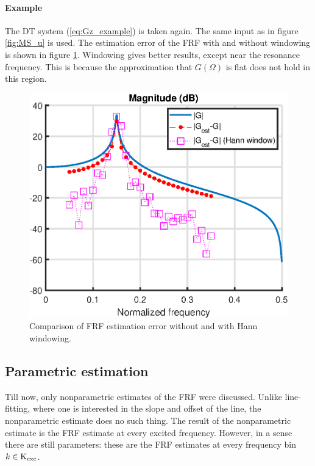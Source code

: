 \newpage
\paragraph{Example}
The DT system (\ref{eq:Gz_example}) is taken again. The same input as in figure \ref{fig:MS_u} is used. The estimation error of the FRF with and without windowing is shown in figure \ref{fig:hann_window_FRF}. Windowing gives better results, except near the resonance frequency. This is because the approximation that $G(\Omega)$ is flat does not hold in this region.
\begin{figure}[H]
    \centering
    \includegraphics[width =0.65 \textwidth]{figures/hann_window.eps}
    \caption{Comparison of FRF estimation error without and with Hann windowing.}
    \label{fig:hann_window_FRF}
\end{figure}


\subsection{Parametric estimation}
Till now, only nonparametric estimates of the FRF were discussed. Unlike line-fitting, where one is interested in the slope and offset of the line, the nonparametric estimate does no such thing. The result of the nonparametric estimate is the FRF estimate at every excited frequency. However, in a sense there are still parameters: these are the FRF estimates at every frequency bin $k \in \text{K}_{\text{exc}}$.

